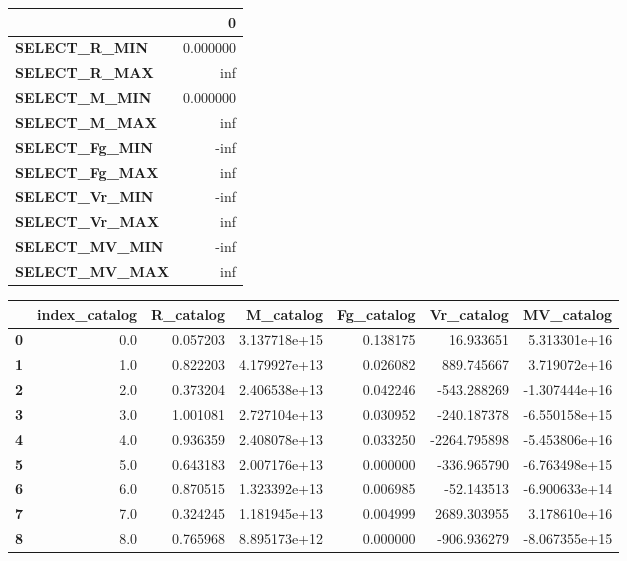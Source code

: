 \documentclass{report}[12pt]
\begin{document}
\begin{center}
\begin{tabular}{lr}
\toprule
{} &         0 \\
\midrule
\textbf{SELECT\_R\_MIN } &  0.000000 \\
\textbf{SELECT\_R\_MAX } &       inf \\
\textbf{SELECT\_M\_MIN } &  0.000000 \\
\textbf{SELECT\_M\_MAX } &       inf \\
\textbf{SELECT\_Fg\_MIN} &      -inf \\
\textbf{SELECT\_Fg\_MAX} &       inf \\
\textbf{SELECT\_Vr\_MIN} &      -inf \\
\textbf{SELECT\_Vr\_MAX} &       inf \\
\textbf{SELECT\_MV\_MIN} &      -inf \\
\textbf{SELECT\_MV\_MAX} &       inf \\
\bottomrule
\end{tabular}
\begin{tabular}{lrrrrrr}
\toprule
{} &  index\_catalog &  R\_catalog &     M\_catalog &  Fg\_catalog &   Vr\_catalog &    MV\_catalog \\
\midrule
\textbf{0   } &            0.0 &   0.057203 &  3.137718e+15 &    0.138175 &    16.933651 &  5.313301e+16 \\
\textbf{1   } &            1.0 &   0.822203 &  4.179927e+13 &    0.026082 &   889.745667 &  3.719072e+16 \\
\textbf{2   } &            2.0 &   0.373204 &  2.406538e+13 &    0.042246 &  -543.288269 & -1.307444e+16 \\
\textbf{3   } &            3.0 &   1.001081 &  2.727104e+13 &    0.030952 &  -240.187378 & -6.550158e+15 \\
\textbf{4   } &            4.0 &   0.936359 &  2.408078e+13 &    0.033250 & -2264.795898 & -5.453806e+16 \\
\textbf{5   } &            5.0 &   0.643183 &  2.007176e+13 &    0.000000 &  -336.965790 & -6.763498e+15 \\
\textbf{6   } &            6.0 &   0.870515 &  1.323392e+13 &    0.006985 &   -52.143513 & -6.900633e+14 \\
\textbf{7   } &            7.0 &   0.324245 &  1.181945e+13 &    0.004999 &  2689.303955 &  3.178610e+16 \\
\textbf{8   } &            8.0 &   0.765968 &  8.895173e+12 &    0.000000 &  -906.936279 & -8.067355e+15 \\

\end{tabular}
\end{center}
\end{document}
